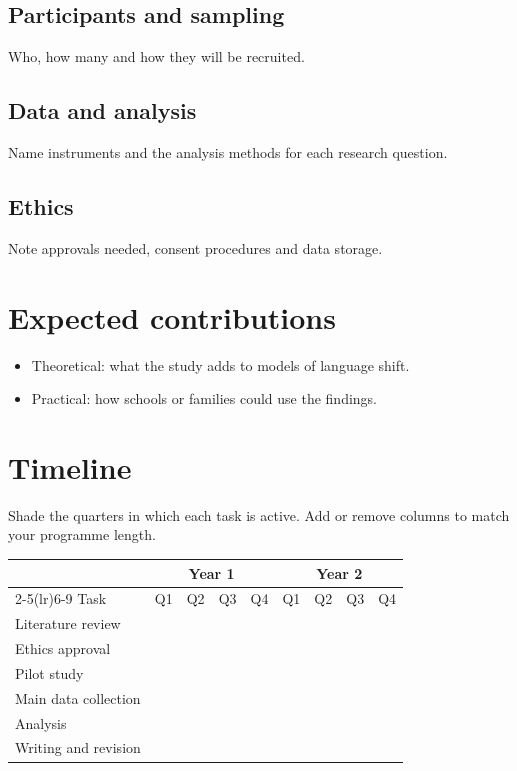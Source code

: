 \documentclass[11pt,a4paper]{article}
\newcommand{\on}{\cellcolor{done!60}}
\begin{document}
\subsection{Participants and sampling}
Who, how many and how they will be recruited.
\subsection{Data and analysis}
Name instruments and the analysis methods for each research question.
\subsection{Ethics}
Note approvals needed, consent procedures and data storage.

\section{Expected contributions}
\begin{itemize}
  \item Theoretical: what the study adds to models of language shift.
  \item Practical: how schools or families could use the findings.
\end{itemize}

\section{Timeline}
Shade the quarters in which each task is active. Add or remove columns to match your programme length.

\begin{center}
\small
\setlength{\tabcolsep}{4pt}
\begin{tabular}{@{}l*{8}{c}}
\toprule
 & \multicolumn{4}{c}{Year 1} & \multicolumn{4}{c}{Year 2} \\
\cmidrule(lr){2-5}\cmidrule(lr){6-9}
Task & Q1 & Q2 & Q3 & Q4 & Q1 & Q2 & Q3 & Q4 \\
\midrule
Literature review & \on & \on & & & & & & \\
Ethics approval & & \on & & & & & & \\
Pilot study & & & \on & & & & & \\
Main data collection & & & & \on & \on & & & \\
Analysis & & & & & \on & \on & & \\
Writing and revision & & & & & & \on & \on & \on \\
\bottomrule
\end{tabular}
\end{center}
\end{document}
